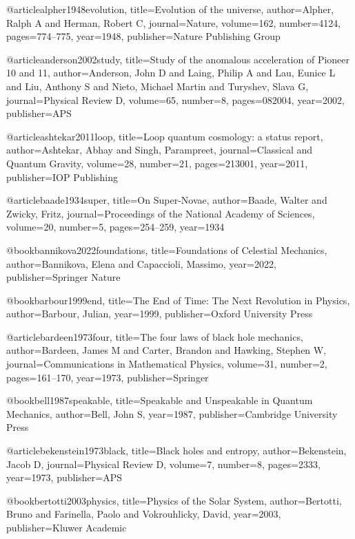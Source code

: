 \documentclass[aps,prresearch,reprint,onecolumn,superscriptaddress,nofootinbib,12pt]{revtex4-2}
\begin{document}
@article{alpher1948evolution,
  title={Evolution of the universe},
  author={Alpher, Ralph A and Herman, Robert C},
  journal={Nature},
  volume={162},
  number={4124},
  pages={774--775},
  year={1948},
  publisher={Nature Publishing Group}
}

@article{anderson2002study,
  title={Study of the anomalous acceleration of Pioneer 10 and 11},
  author={Anderson, John D and Laing, Philip A and Lau, Eunice L and Liu, Anthony S and Nieto, Michael Martin and Turyshev, Slava G},
  journal={Physical Review D},
  volume={65},
  number={8},
  pages={082004},
  year={2002},
  publisher={APS}
}

@article{ashtekar2011loop,
  title={Loop quantum cosmology: a status report},
  author={Ashtekar, Abhay and Singh, Parampreet},
  journal={Classical and Quantum Gravity},
  volume={28},
  number={21},
  pages={213001},
  year={2011},
  publisher={IOP Publishing}
}

@article{baade1934super,
  title={On Super-Novae},
  author={Baade, Walter and Zwicky, Fritz},
  journal={Proceedings of the National Academy of Sciences},
  volume={20},
  number={5},
  pages={254--259},
  year={1934}
}

@book{bannikova2022foundations,
  title={Foundations of Celestial Mechanics},
  author={Bannikova, Elena and Capaccioli, Massimo},
  year={2022},
  publisher={Springer Nature}
}

@book{barbour1999end,
  title={The End of Time: The Next Revolution in Physics},
  author={Barbour, Julian},
  year={1999},
  publisher={Oxford University Press}
}

@article{bardeen1973four,
  title={The four laws of black hole mechanics},
  author={Bardeen, James M and Carter, Brandon and Hawking, Stephen W},
  journal={Communications in Mathematical Physics},
  volume={31},
  number={2},
  pages={161--170},
  year={1973},
  publisher={Springer}
}

@book{bell1987speakable,
  title={Speakable and Unspeakable in Quantum Mechanics},
  author={Bell, John S},
  year={1987},
  publisher={Cambridge University Press}
}

@article{bekenstein1973black,
  title={Black holes and entropy},
  author={Bekenstein, Jacob D},
  journal={Physical Review D},
  volume={7},
  number={8},
  pages={2333},
  year={1973},
  publisher={APS}
}

@book{bertotti2003physics,
  title={Physics of the Solar System},
  author={Bertotti, Bruno and Farinella, Paolo and Vokrouhlicky, David},
  year={2003},
  publisher={Kluwer Academic}
}
\end{document}
